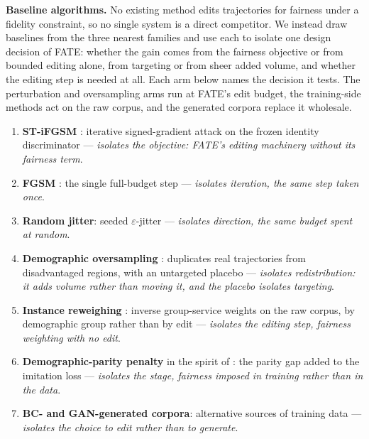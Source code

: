 \textbf{Baseline algorithms.} No existing method edits trajectories for
fairness under a fidelity constraint, so no single system is a direct
competitor. We instead draw baselines from the three nearest families and use
each to isolate one design decision of FATE: whether the gain comes from the
fairness objective or from bounded editing alone, from targeting or from sheer
added volume, and whether the editing step is needed at all. Each arm below
names the decision it tests. The perturbation and oversampling arms run at
FATE's edit budget, the training-side methods act on the raw corpus, and the
generated corpora replace it wholesale.
\begin{enumerate}[topsep=2pt,itemsep=0pt,parsep=0pt,leftmargin=1.4em]
\item \textbf{ST-iFGSM} \cite{hu2023stifgsm}: iterative signed-gradient attack
on the frozen identity discriminator --- \emph{isolates the objective: FATE's
editing machinery without its fairness term}.
\item \textbf{FGSM} \cite{goodfellow2015fgsm}: the single full-budget step ---
\emph{isolates iteration, the same step taken once}.
\item \textbf{Random jitter}: seeded $\varepsilon$-jitter ---
\emph{isolates direction, the same budget spent at random}.
\item \textbf{Demographic oversampling} \cite{pastaltzidis2022dataaug}:
duplicates real trajectories from disadvantaged regions, with an untargeted
placebo --- \emph{isolates redistribution: it adds volume rather than moving
it, and the placebo isolates targeting}.
\item \textbf{Instance reweighing} \cite{kamirancalders2012}: inverse
group-service weights on the raw corpus, by demographic group rather than by
edit --- \emph{isolates the editing step, fairness weighting with no edit}.
\item \textbf{Demographic-parity penalty} in the spirit of \cite{zheng2023}:
the parity gap added to the imitation loss --- \emph{isolates the stage,
fairness imposed in training rather than in the data}.
\item \textbf{BC- and GAN-generated corpora}: alternative sources of training
data --- \emph{isolates the choice to edit rather than to generate}.
\end{enumerate}

